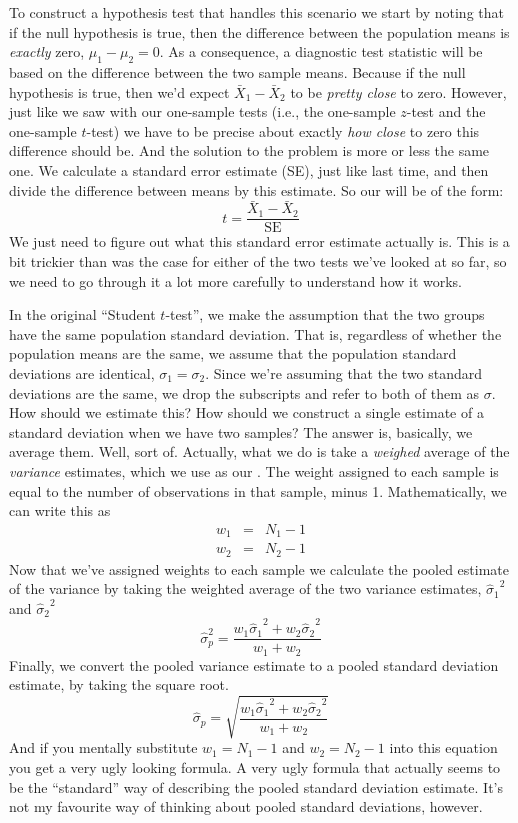 To construct a hypothesis test that handles this scenario we start by noting that if the null hypothesis is true, then the difference between the population means is {\it exactly} zero, 
$\mu_1 - \mu_2 = 0$. As a consequence, a diagnostic test statistic will be based on the difference between the two sample means. Because if the null hypothesis is true, then we'd expect 
$\bar{X}_1 - \bar{X}_2$ to be {\it pretty close} to zero. However, just like we saw with our one-sample tests (i.e., the one-sample $z$-test and the one-sample $t$-test) we have to be precise about exactly {\it how close} to zero this difference should be. And the solution to the problem is more or less the same one. We calculate a standard error estimate (SE), just like last time, and then divide the difference between means by this estimate. So our  will be of the form:
$$
t = \frac{\bar{X}_1 - \bar{X}_2}{\mbox{SE}}
$$
We just need to figure out what this standard error estimate actually is. This is a bit trickier than was the case for either of the two tests we've looked at so far, so we need to go through it a lot more carefully to understand how it works.


In the original ``Student $t$-test'', we make the assumption that the two groups have the same population standard deviation. That is, regardless of whether the population means are the same, we assume that the population standard deviations are identical, $\sigma_1 = \sigma_2$. Since we're assuming that the two standard deviations are the same, we drop the subscripts and refer to both of them as $\sigma$. How should we estimate this? How should we construct a single estimate of a standard deviation when we have two samples? The answer is, basically, we average them. Well, sort of. Actually, what we do is take a {\it weighed} average of the {\it variance} estimates, which we use as our . The weight assigned to each sample is equal to the number of observations in that sample, minus 1. Mathematically, we can write this as
$$
\begin{array}{rcl}
w_1 &=& N_1 - 1\\
w_2 &=& N_2 - 1
\end{array}
$$
Now that we've assigned weights to each sample we calculate the pooled estimate of the variance by taking the weighted average of the two variance estimates, ${\hat\sigma_1}^2$ and ${\hat\sigma_2}^2$ 
$$
\hat\sigma^2_p = \frac{w_1 {\hat\sigma_1}^2 + w_2 {\hat\sigma_2}^2}{w_1 + w_2}
$$
Finally, we convert the pooled variance estimate to a pooled standard deviation estimate, by taking the square root. 
$$
\hat\sigma_p = \sqrt{\frac{w_1 {\hat\sigma_1}^2 + w_2 {\hat\sigma_2}^2}{w_1 + w_2}}
$$
And if you mentally substitute $w_1 = N_1 -1$ and $w_2 = N_2 -1$ into this equation you get a very ugly looking formula. A very ugly formula that actually seems to be the ``standard'' way of describing the pooled standard deviation estimate. It's not my favourite way of thinking about pooled standard deviations, however. 

